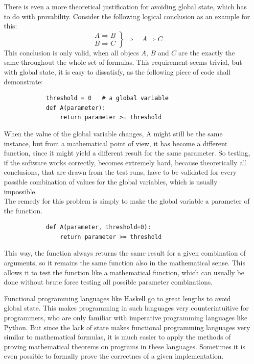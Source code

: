 		There is even a more theoretical justification for avoiding global state, which has to do with provability.
		Consider the following logical conclusion as an example for this:
		\begin{equation}
			\left.
			\begin{aligned}
				A \Rightarrow B\\
				B \Rightarrow C
			\end{aligned}
			\right\} \Rightarrow \quad A \Rightarrow C
		\end{equation}
		This conclusion is only valid, when all objecs \(A\), \(B\) and \(C\) are the exactly the same throughout the whole set of formulas.
		This requirement seems trivial, but with global state, it is easy to dissatisfy, as the following piece of code shall demonstrate:
		\begin{verbatim}
			threshold = 0	# a global variable
			def A(parameter):
				return parameter >= threshold
		\end{verbatim}
		When the value of the global variable changes, {\normalfont \ttfamily A} might still be the same instance, but from a mathematical point of view, it has become a different function, since it might yield a different result for the same parameter.
		So testing, if the software works correctly, becomes extremely hard, because theoretically all conclusions, that are drawn from the test runs, have to be validated for every possible combination of values for the global variables, which is usually impossible.\\
		The remedy for this problem is simply to make the global variable a parameter of the function.
		\begin{verbatim}
			def A(parameter, threshold=0):
				return parameter >= threshold
		\end{verbatim}
		This way, the function always returns the same result for a given combination of arguments, so it remains the same function also in the mathematical sense.
		This allows it to test the function like a mathematical function, which can usually be done without brute force testing all possible parameter combinations.

		Functional programming languages like Haskell go to great lengths to avoid global state.
		This makes programming in such languages very counterintuitive for programmers, who are only familiar with imperative programming languages like Python.
		But since the lack of state makes functional programming languages very similar to mathematical formulas, it is much easier to apply the methods of proving mathematical theorems on programs in these languages.
		Sometimes it is even possible to formally prove the correctnes of a given implementation.


